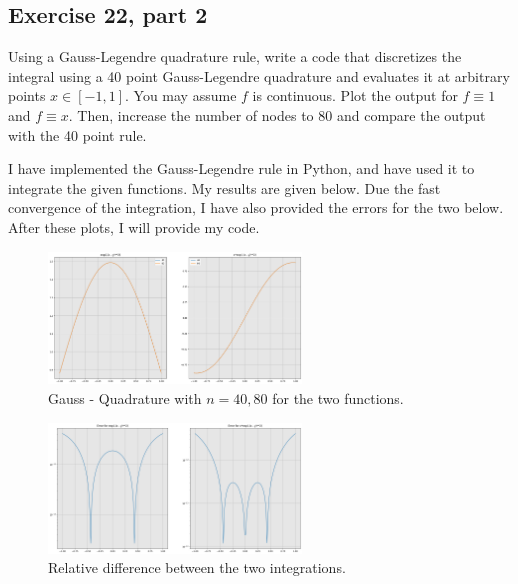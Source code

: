 \subsection{Exercise 22, part 2}
Using a Gauss-Legendre quadrature rule, write a code that discretizes the integral using a 40 point Gauss-Legendre quadrature and evaluates it at arbitrary points $x \in [-1, 1]$. You may assume $f$ is continuous. Plot the output for $f \equiv 1$ and $f \equiv x$. Then, increase the number of nodes to 80 and compare the output with the 40 point rule. 
\partbreak
\begin{solution}

   I have implemented the Gauss-Legendre rule in Python, and have used it to integrate the given functions. My results are given below. Due the fast convergence of the integration, I have also provided the errors for the two below. After these plots, I will provide my code.
\end{solution}
\vspace{0.5in}
\begin{figure}[!ht]
    \centering
    \includegraphics[width = 0.6\textwidth]{Plots/Exercise 22b1.png}
    \caption{Gauss - Quadrature with $n = 40, 80$ for the two functions.}
    \label{fig:Exercise 22b1}
\end{figure}
\begin{figure}[!ht]
    \centering
    \includegraphics[width = 0.6\textwidth]{Plots/Exercise 22b2.png}
    \caption{Relative difference between the two integrations.}
    \label{fig:Exercise 22b2}
\end{figure}
\newpage


\newpage
